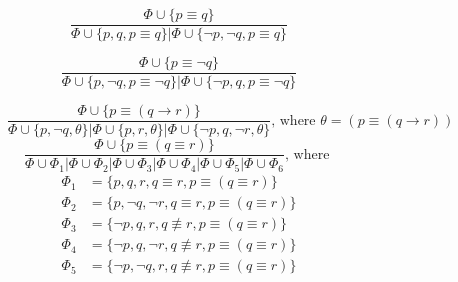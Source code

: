\documentclass{article}
\theoremstyle{definition}
\newcommand*{\eq}{\equiv}
\newcommand*{\ra}{\rightarrow}
\begin{document}
\begin{figure}
    \begin{subfigure}{\textwidth}
        \begin{subfigure}{0.48\textwidth}
            \begin{equation}
                \tag{$ \eq_\top $}
                \frac{
                    \Phi \cup \{ p \eq q \} }%
                { \Phi \cup \{ p, q, p\eq q \} | \Phi \cup \{ \lnot p, \lnot q, p\eq q \} }
            \end{equation}
        \end{subfigure}
        \begin{subfigure}{0.48\textwidth}
            \begin{equation}
                \tag{$ \eq_\top^\lnot $}
                \frac{
                    \Phi \cup \{ p \eq \lnot q \} }%
                { \Phi \cup \{ p, \lnot q, p \eq \lnot q \} | \Phi \cup \{ \lnot p, q, p\eq \lnot q \} }
            \end{equation}
        \end{subfigure}
        \begin{equation}
            \tag{$ \eq_\top^\ra $}
            \frac{
                \Phi \cup \{ p \eq (q \ra r) \} }%
            { \Phi \cup \{ p, \lnot q, \theta \} | \Phi \cup \{ p, r, \theta \} | \Phi \cup \{ \lnot p, q, \lnot r, \theta \}}
            \text{, where } \theta = (p \eq (q \ra r))
        \end{equation}
        \begin{equation}
            \tag{$ \eq_\top^\eq $}
            \frac{
                \Phi \cup \{ p \eq (q \eq r) \} }%
            { \Phi \cup \Phi_1 |
                \Phi \cup \Phi_2 |
                \Phi \cup \Phi_3 |
                \Phi \cup \Phi_4 |
                \Phi \cup \Phi_5 |
                \Phi \cup \Phi_6
            }
            \text{, where }
        \end{equation}
        \[
            \begin{aligned}
                \Phi_1 & = \{p, q, r, q \eq r, p \eq (q \eq r) \}                       \\
                \Phi_2 & = \{p, \lnot q, \lnot r, q \eq r, p \eq (q \eq r) \}           \\
                \Phi_3 & = \{\lnot p, q, r, q \not \eq r, p \eq (q \eq r) \}            \\
                \Phi_4 & = \{\lnot p, q, \lnot r, q \not \eq r, p \eq (q \eq r) \}      \\
                \Phi_5 & = \{\lnot p,\lnot q, r, q \not \eq r, p \eq (q \eq r) \}       \\

\end{aligned}\]
\end{subfigure}
\end{figure}
\end{document}
